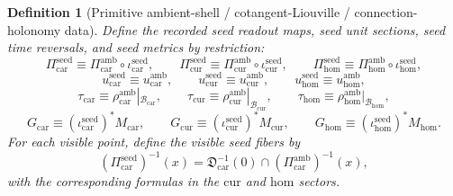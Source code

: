 \documentclass[11pt]{article}
\newcommand{\TensorSeedSpace}{\mathcal B_{\mathrm{car}}}
\newcommand{\CurSeedSpace}{\mathcal B_{\mathrm{cur}}}
\newcommand{\HomSeedSpace}{\mathcal B_{\mathrm{hom}}}
\newcommand{\TensorSeedRead}{\Pi_{\mathrm{car}}^{\mathrm{seed}}}
\newcommand{\CurSeedRead}{\Pi_{\mathrm{cur}}^{\mathrm{seed}}}
\newcommand{\HomSeedRead}{\Pi_{\mathrm{hom}}^{\mathrm{seed}}}
\newcommand{\TensorSeedUnit}{u_{\mathrm{car}}^{\mathrm{seed}}}
\newcommand{\CurSeedUnit}{u_{\mathrm{cur}}^{\mathrm{seed}}}
\newcommand{\HomSeedUnit}{u_{\mathrm{hom}}^{\mathrm{seed}}}
\newcommand{\TensorSeedTimeRev}{\tau_{\mathrm{car}}}
\newcommand{\CurSeedTimeRev}{\tau_{\mathrm{cur}}}
\newcommand{\HomSeedTimeRev}{\tau_{\mathrm{hom}}}
\newcommand{\TensorSeedMetric}{G_{\mathrm{car}}}
\newcommand{\CurSeedMetric}{G_{\mathrm{cur}}}
\newcommand{\HomSeedMetric}{G_{\mathrm{hom}}}
\newcommand{\TensorAmbientRead}{\Pi_{\mathrm{car}}^{\mathrm{amb}}}
\newcommand{\CurAmbientRead}{\Pi_{\mathrm{cur}}^{\mathrm{amb}}}
\newcommand{\HomAmbientRead}{\Pi_{\mathrm{hom}}^{\mathrm{amb}}}
\newcommand{\TensorAmbientUnit}{u_{\mathrm{car}}^{\mathrm{amb}}}
\newcommand{\CurAmbientUnit}{u_{\mathrm{cur}}^{\mathrm{amb}}}
\newcommand{\HomAmbientUnit}{u_{\mathrm{hom}}^{\mathrm{amb}}}
\newcommand{\TensorAmbientTimeRev}{\rho_{\mathrm{car}}^{\mathrm{amb}}}
\newcommand{\CurAmbientTimeRev}{\rho_{\mathrm{cur}}^{\mathrm{amb}}}
\newcommand{\HomAmbientTimeRev}{\rho_{\mathrm{hom}}^{\mathrm{amb}}}
\newcommand{\TensorAmbientMetric}{M_{\mathrm{car}}}
\newcommand{\CurAmbientMetric}{M_{\mathrm{cur}}}
\newcommand{\HomAmbientMetric}{M_{\mathrm{hom}}}
\newcommand{\TensorShellSection}{\mathfrak D_{\mathrm{car}}}
\newcommand{\TensorSeedInc}{\iota_{\mathrm{car}}^{\mathrm{seed}}}
\newcommand{\CurSeedInc}{\iota_{\mathrm{cur}}^{\mathrm{seed}}}
\newcommand{\HomSeedInc}{\iota_{\mathrm{hom}}^{\mathrm{seed}}}
\newtheorem{definition}{Definition}
\begin{document}
\begin{definition}[Primitive ambient-shell / cotangent-Liouville / connection-holonomy data]
Define the recorded seed readout maps, seed unit sections, seed time reversals, and seed metrics by restriction:
\begin{equation}
\TensorSeedRead\equiv\TensorAmbientRead\circ\TensorSeedInc,\qquad
\CurSeedRead\equiv\CurAmbientRead\circ\CurSeedInc,\qquad
\HomSeedRead\equiv\HomAmbientRead\circ\HomSeedInc,
\label{eq:seed_read_from_ambient}
\end{equation}
\begin{equation}
\TensorSeedUnit\equiv\TensorAmbientUnit,\qquad
\CurSeedUnit\equiv\CurAmbientUnit,\qquad
\HomSeedUnit\equiv\HomAmbientUnit,
\label{eq:seed_unit_from_ambient}
\end{equation}
\begin{equation}
\TensorSeedTimeRev\equiv\TensorAmbientTimeRev|_{\TensorSeedSpace},\qquad
\CurSeedTimeRev\equiv\CurAmbientTimeRev|_{\CurSeedSpace},\qquad
\HomSeedTimeRev\equiv\HomAmbientTimeRev|_{\HomSeedSpace},
\label{eq:seed_time_rev_from_ambient}
\end{equation}
\begin{equation}
\TensorSeedMetric\equiv(\TensorSeedInc)^*\TensorAmbientMetric,\qquad
\CurSeedMetric\equiv(\CurSeedInc)^*\CurAmbientMetric,\qquad
\HomSeedMetric\equiv(\HomSeedInc)^*\HomAmbientMetric.
\label{eq:seed_metric_from_ambient}
\end{equation}
For each visible point, define the visible seed fibers by
\begin{equation}
(\TensorSeedRead)^{-1}(x)
=
\TensorShellSection^{-1}(0)\cap(\TensorAmbientRead)^{-1}(x),
\label{eq:seed_fiber_from_ambient_car}
\end{equation}
with the corresponding formulas in the \(\mathrm{cur}\) and \(\mathrm{hom}\) sectors.
\end{definition}
\end{document}
